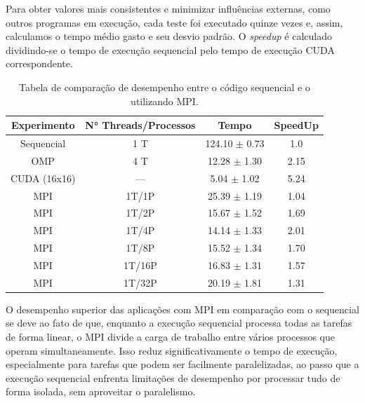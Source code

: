 \documentclass[12pt]{article}
\begin{document}
Para obter valores mais consistentes e minimizar influências externas, como
outros programas em execução, cada teste foi executado quinze vezes e, assim,
calculamos o tempo médio gasto e seu desvio padrão. O \textit{speedup} é
calculado dividindo-se o tempo de execução sequencial pelo tempo de execução
CUDA correspondente.

\begin{table}[ht]
  \centering
  \caption{Tabela de comparação de desempenho entre o código sequencial e o
    utilizando MPI.}\label{tab:results}
  \vspace{0.3cm}
  \begin{tabular}{||c c c c||}
    \hline
    Experimento  & N° Threads/Processos & Tempo             & SpeedUp \\ [0.5ex]
    \hline\hline
    Sequencial   & 1 T                  & 124.10 $\pm$ 0.73 & 1.0     \\
    \hline
    OMP          & 4 T                  & 12.28 $\pm$ 1.30  & 2.15     \\
    \hline
    CUDA (16x16) & ---                  & 5.04 $\pm$ 1.02   & 5.24     \\
    \hline
    MPI          & 1T/1P                & 25.39 $\pm$ 1.19  & 1.04    \\
    \hline
    MPI          & 1T/2P                & 15.67 $\pm$ 1.52  & 1.69    \\
    \hline
    MPI          & 1T/4P                & 14.14 $\pm$ 1.33  & 2.01    \\
    \hline
    MPI          & 1T/8P                & 15.52 $\pm$ 1.34  & 1.70    \\
    \hline
    MPI          & 1T/16P               & 16.83 $\pm$ 1.31  & 1.57    \\
    \hline
    MPI          & 1T/32P               & 20.19 $\pm$ 1.81  & 1.31    \\
    \hline
  \end{tabular}
\end{table}

O desempenho superior das aplicações com MPI em comparação com o sequencial se
deve ao fato de que, enquanto a execução sequencial processa todas as tarefas
de forma linear, o MPI divide a carga de trabalho entre vários processos que
operam simultaneamente. Isso reduz significativamente o tempo de execução,
especialmente para tarefas que podem ser facilmente paralelizadas, ao passo que
a execução sequencial enfrenta limitações de desempenho por processar tudo de
forma isolada, sem aproveitar o paralelismo.
\end{document}
